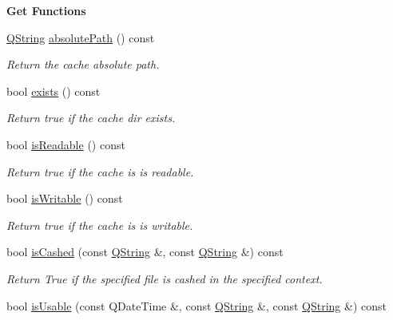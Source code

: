 \begin{Indent}{\bf Get Functions}\par
\begin{DoxyCompactItemize}
\item 
\hyperlink{group___u_a_v_objects_plugin_gab9d252f49c333c94a72f97ce3105a32d}{Q\-String} \hyperlink{class_g_l_c___cache_manager_a95d35bd92da8fb4b30deaf53db5f9848}{absolute\-Path} () const 
\begin{DoxyCompactList}\small\item\em Return the cache absolute path. \end{DoxyCompactList}\item 
bool \hyperlink{class_g_l_c___cache_manager_a6f5c16eb62bfa67f2483bf956f959a13}{exists} () const 
\begin{DoxyCompactList}\small\item\em Return true if the cache dir exists. \end{DoxyCompactList}\item 
bool \hyperlink{class_g_l_c___cache_manager_addfe3928255b00a0cbf901f68e8e3b57}{is\-Readable} () const 
\begin{DoxyCompactList}\small\item\em Return true if the cache is is readable. \end{DoxyCompactList}\item 
bool \hyperlink{class_g_l_c___cache_manager_abbd116716f5d74c1f3edea0cfcc18f71}{is\-Writable} () const 
\begin{DoxyCompactList}\small\item\em Return true if the cache is is writable. \end{DoxyCompactList}\item 
bool \hyperlink{class_g_l_c___cache_manager_a3b8c874b107046b99d217dac81442b1f}{is\-Cashed} (const \hyperlink{group___u_a_v_objects_plugin_gab9d252f49c333c94a72f97ce3105a32d}{Q\-String} \&, const \hyperlink{group___u_a_v_objects_plugin_gab9d252f49c333c94a72f97ce3105a32d}{Q\-String} \&) const 
\begin{DoxyCompactList}\small\item\em Return True if the specified file is cashed in the specified context. \end{DoxyCompactList}\item 
bool \hyperlink{class_g_l_c___cache_manager_af3e47914ab7d0bfb73d143ab9f5e392c}{is\-Usable} (const Q\-Date\-Time \&, const \hyperlink{group___u_a_v_objects_plugin_gab9d252f49c333c94a72f97ce3105a32d}{Q\-String} \&, const \hyperlink{group___u_a_v_objects_plugin_gab9d252f49c333c94a72f97ce3105a32d}{Q\-String} \&) const 

\end{DoxyCompactItemize}
\end{Indent}
